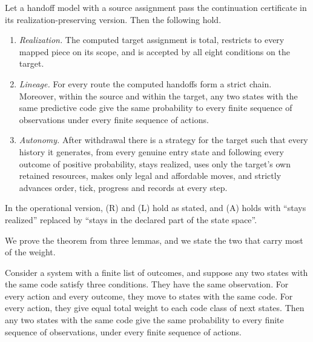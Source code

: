 \begin{theorem}
\label{thm:continuation}
Let a handoff model with a source assignment pass the continuation certificate
in its realization-preserving version. Then the following hold.
\begin{enumerate}
\item[(R)] \emph{Realization.} The computed target assignment is total,
restricts to every mapped piece on its scope, and is accepted by all eight
conditions on the target.
\item[(L)] \emph{Lineage.} For every route the computed handoffs form a
strict chain. Moreover, within the source and within the target, any two
states with the same predictive code give the same probability to every finite
sequence of observations under every finite sequence of actions.
\item[(A)] \emph{Autonomy.} After withdrawal there is a strategy for the target
such that every history it generates, from every genuine entry state and
following every outcome of positive probability, stays realized, uses only the
target's own retained resources, makes only legal and affordable moves, and
strictly advances order, tick, progress and records at every step.
\end{enumerate}
In the operational version, (R) and (L) hold as stated, and (A) holds with
``stays realized'' replaced by ``stays in the declared part of the state
space''.
\end{theorem}

We prove the theorem from three lemmas, and we state the two that carry most
of the weight.

\begin{lemma}
\label{lem:lumping}
Consider a system with a finite list of outcomes, and suppose any two states
with the same code satisfy three conditions. They have the same observation.
For every action and every outcome, they move to states with the same code.
For every action, they give equal total weight to each code class of next
states. Then any two states with the same code give the same probability to
every finite sequence of observations, under every finite sequence of
actions.
\end{lemma}

